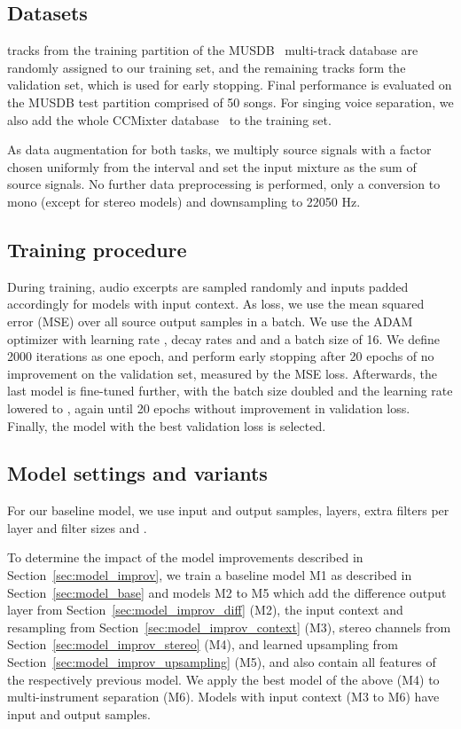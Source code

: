 \documentclass{article}
\begin{document}
\subsection{Datasets}

 tracks from the training partition of the MUSDB~\cite{Rafii2017} multi-track database are randomly assigned to our training set, and the remaining  tracks form the validation set, which is used for early stopping.
Final performance is evaluated on the MUSDB test partition comprised of 50 songs.
For singing voice separation, we also add the whole CCMixter database~\cite{Liutkus2015} to the training set.

As data augmentation for both tasks, we multiply source signals with a factor chosen uniformly from the interval  and set the input mixture as the sum of source signals.
No further data preprocessing is performed, only a conversion to mono (except for stereo models) and downsampling to 22050 Hz.

\subsection{Training procedure}

During training, audio excerpts are sampled randomly and inputs padded accordingly for models with input context.
As loss, we use the mean squared error (MSE) over all source output samples in a batch.
We use the ADAM optimizer with learning rate , decay rates  and  and a batch size of 16.
We define 2000 iterations as one epoch, and perform early stopping after 20 epochs of no improvement on the validation set, measured by the MSE loss.
Afterwards, the last model is fine-tuned further, with the batch size doubled and the learning rate lowered to , again until 20 epochs without improvement in validation loss.
Finally, the model with the best validation loss is selected.

\subsection{Model settings and variants}

For our baseline model, we use  input and output samples,  layers,  extra filters per layer and filter sizes  and .

To determine the impact of the model improvements described in Section~\ref{sec:model_improv}, we train a baseline model M1 as described in Section~\ref{sec:model_base} and models M2 to M5 which add the difference output layer from Section~\ref{sec:model_improv_diff} (M2), the input context and resampling from Section~\ref{sec:model_improv_context} (M3), stereo channels from Section~\ref{sec:model_improv_stereo} (M4), and learned upsampling from Section~\ref{sec:model_improv_upsampling} (M5), and also contain all features of the respectively previous model.
We apply the best model of the above (M4) to multi-instrument separation (M6).
Models with input context (M3 to M6) have  input and  output samples.
\end{document}
